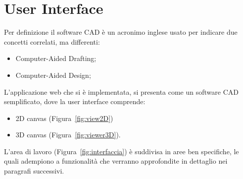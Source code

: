 \section{User Interface}
\label{sec:chapter_2_section_2}

Per definizione il software CAD è un acronimo inglese usato per indicare due concetti correlati, ma differenti:
\begin{itemize}
  \item Computer-Aided Drafting;
  \item Computer-Aided Design;
\end{itemize}
L'applicazione web che si è implementata, si presenta come un software CAD semplificato, dove la
user interface comprende:
\begin{itemize}
  \item 2D canvas (Figura~\ref{fig:view2D})
  \item 3D canvas (Figura~\ref{fig:viewer3D}).
\end{itemize}

L'area di lavoro (Figura~\ref{fig:interfaccia}) è suddivisa in aree ben specifiche,
le quali adempiono a funzionalità che verranno approfondite in dettaglio nei paragrafi successivi.\\

